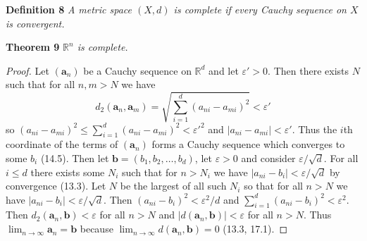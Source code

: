 \documentclass{article}
\begin{document}
\begin{flushleft}
\textbf{Definition 8}
\textsl{A metric space $(X,d)$ is complete if every Cauchy sequence on $X$ is convergent.}\newline

\textbf{Theorem 9}
\textsl{$\mathbb{R}^n$ is complete.}
\begin{proof}
Let $(\mathbf{a}_n)$ be a Cauchy sequence on $\mathbb{R}^d$ and let $\varepsilon' > 0$. Then there exists $N$ such that for all $n,m > N$ we have
\[
d_2(\mathbf{a}_n,\mathbf{a}_m) = \sqrt{\sum_{i=1}^{d} (a_{ni}-a_{mi})^2} < \varepsilon'
\]
so $(a_{ni}-a_{mi})^2 \leq \sum_{i=1}^{d} (a_{ni}-a_{mi})^2 < \varepsilon'^2$ and $|a_{ni}-a_{mi}| < \varepsilon'$. Thus the $i$th coordinate of the terms of $(\mathbf{a}_n)$ forms a Cauchy sequence which converges to some $b_i$ (14.5). Then let $\mathbf{b}=(b_1,b_2, \dots ,b_d)$, let $\varepsilon > 0$ and consider $\varepsilon/\sqrt{d}$. For all $i \leq d$ there exists some $N_i$ such that for $n>N_i$ we have $|a_{ni}-b_{i}| < \varepsilon/\sqrt{d}$ by convergence (13.3). Let $N$ be the largest of all such $N_i$ so that for all $n>N$ we have $|a_{ni}-b_{i}| < \varepsilon/\sqrt{d}$. Then $(a_{ni}-b_{i})^2 < \varepsilon^2/d$ and $\sum_{i=1}^{d} (a_{ni}-b_{i})^2 < \varepsilon^2$. Then $d_2(\mathbf{a}_n,\mathbf{b}) < \varepsilon$ for all $n > N$ and $|d(\mathbf{a}_n, \mathbf{b})| < \varepsilon$ for all $n>N$. Thus $\lim_{n \rightarrow \infty} \mathbf{a}_n = \mathbf{b}$ because $\lim_{n \rightarrow \infty} d(\mathbf{a}_n, \mathbf{b}) = 0$ (13.3, 17.1).
\end{proof}


\end{flushleft}
\end{document}
